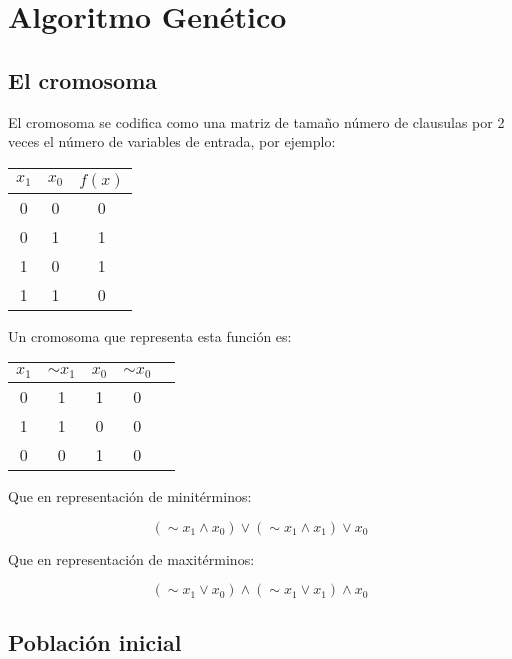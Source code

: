 \documentclass[a4paper]{article}
\begin{document}
\section{Algoritmo Genético}

\subsection{El cromosoma}

El cromosoma se codifica como una matriz de tamaño número de clausulas por 2 veces el número de variables de entrada, por ejemplo:

\begin{table}[H]
	\centering
	\begin{tabular}{|c | c | c|}
		\hline
		$x_1$ & $x_0$ & $f(x)$ \\
		\hline
		0 & 0& 0\\
		\hline
		0 & 1 & 1\\
		\hline
		1 & 0& 1\\
		\hline
		1 & 1 & 0\\
		\hline
	\end{tabular}
\end{table}

Un cromosoma que representa esta función es:

\begin{table}[H]
	\centering
	\begin{tabular}{|c | c | c|  c|  c|}
		\hline
		$x_1$ & $ \sim{x_1}$ & $x_0$ & $ \sim{x_0}$\\
		\hline
		0 & 1& 1 & 0\\
		\hline
		1 & 1& 0 & 0\\
		\hline
		0 & 0& 1 & 0\\
		\hline
	\end{tabular}
\end{table}

Que en representación de minitérminos:

\begin{equation}
	(\sim{x_1} \wedge x_0) \vee (\sim{x_1} \wedge x_1) \vee x_0
\end{equation}

Que en representación de maxitérminos:

\begin{equation}
	(\sim{x_1} \vee x_0) \wedge (\sim{x_1} \vee x_1) \wedge x_0
\end{equation}

\subsection{Población inicial}
\end{document}
